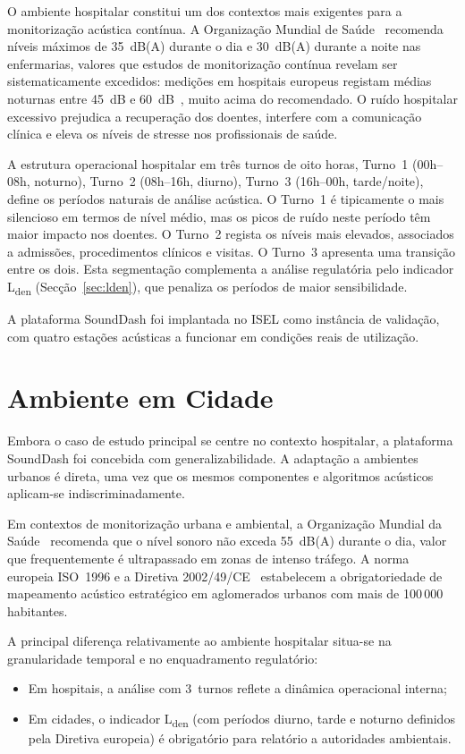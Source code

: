 \documentclass[12pt,a4paper]{report}
\begin{document}
O ambiente hospitalar constitui um dos contextos mais exigentes para a monitorização acústica contínua. A Organização Mundial de Saúde~\cite{oms2018} recomenda níveis máximos de 35~dB(A) durante o dia e 30~dB(A) durante a noite nas enfermarias,  valores que estudos de monitorização contínua revelam ser sistematicamente excedidos: medições em hospitais europeus registam médias noturnas entre 45~dB e 60~dB~\cite{dkhospnoise}, muito acima do recomendado. O ruído hospitalar excessivo prejudica a recuperação dos doentes, interfere com a comunicação clínica e eleva os níveis de stresse nos profissionais de saúde.

A estrutura operacional hospitalar em três turnos de oito horas,  Turno~1 (00h--08h, noturno), Turno~2 (08h--16h, diurno), Turno~3 (16h--00h, tarde/noite),  define os períodos naturais de análise acústica. O Turno~1 é tipicamente o mais silencioso em termos de nível médio, mas os picos de ruído neste período têm maior impacto nos doentes. O Turno~2 regista os níveis mais elevados, associados a admissões, procedimentos clínicos e visitas. O Turno~3 apresenta uma transição entre os dois. Esta segmentação complementa a análise regulatória pelo indicador L\textsubscript{den} (Secção~\ref{sec:lden}), que penaliza os períodos de maior sensibilidade.

A plataforma SoundDash foi implantada no ISEL como instância de validação, com quatro estações acústicas a funcionar em condições reais de utilização.

\section{Ambiente em Cidade}

Embora o caso de estudo principal se centre no contexto hospitalar, a plataforma SoundDash foi concebida com generalizabilidade. A adaptação a ambientes urbanos é direta, uma vez que os mesmos componentes e algoritmos acústicos aplicam-se indiscriminadamente.

Em contextos de monitorização urbana e ambiental, a Organização Mundial da Saúde~\cite{oms2018} recomenda que o nível sonoro não exceda 55~dB(A) durante o dia, valor que frequentemente é ultrapassado em zonas de intenso tráfego. A norma europeia ISO~1996 e a Diretiva 2002/49/CE~\cite{lden} estabelecem a obrigatoriedade de mapeamento acústico estratégico em aglomerados urbanos com mais de 100\,000 habitantes.

A principal diferença relativamente ao ambiente hospitalar situa-se na granularidade temporal e no enquadramento regulatório:
\begin{itemize}[nosep]
  \item Em hospitais, a análise com 3~turnos reflete a dinâmica operacional interna;
  \item Em cidades, o indicador L\textsubscript{den} (com períodos diurno, tarde e noturno definidos pela Diretiva europeia) é obrigatório para relatório a autoridades ambientais.
\end{itemize}
\end{document}
